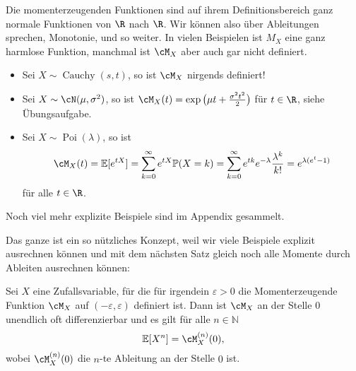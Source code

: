 Die momenterzeugenden Funktionen sind auf ihrem Definitionsbereich ganz normale Funktionen von $\R$ nach $\R$. Wir k\"onnen also \"uber Ableitungen sprechen, Monotonie, und so weiter. In vielen Beispielen ist $M_X$ eine ganz harmlose Funktion, manchmal ist $\cM_X$ aber auch gar nicht definiert.
\begin{beispiel}\label{momg} \abs

\begin{itemize}
	\item Sei $ X \sim \operatorname{Cauchy}(s,t)$, so ist $\cM_X$ nirgends definiert!
	\item Sei $X \sim \cN(\mu, \sigma^2)$, so ist $\cM_X(t) = \exp\big(\mu t + \frac{\sigma^2 t^2}{2}\big)$ f\"ur $t\in\R$, siehe \"Ubungsaufgabe.
	\item Sei $X\sim \operatorname{Poi}(\lambda)$, so ist $$\cM_X(t) = \mathbb{E}[e^{tX}] = \sum\limits_{k=0}^{\infty} e^{tX} \mathbb{P}(X = k) = \sum\limits_{k=0}^{\infty} e^{tk} e^{-\lambda} \frac{\lambda^k}{k!} = e^{\lambda(e^t - 1)}$$ f\"ur alle $t\in\R$.
	\end{itemize}
Noch viel mehr explizite Beispiele sind im Appendix gesammelt.
\end{beispiel}

Das ganze ist ein so n\"utzliches Konzept, weil wir viele Beispiele explizit ausrechnen k\"onnen und mit dem n\"achsten Satz gleich noch alle Momente durch Ableiten ausrechnen k\"onnen:

\begin{satz}
	Sei $X$ eine Zufallsvariable, f\"ur die f\"ur irgendein $\varepsilon>0$ die Momenterzeugende Funktion $\cM_X$ auf $(-\varepsilon, \varepsilon)$ definiert ist. Dann ist $\cM_X$ an der Stelle $0$ unendlich oft differenzierbar und es gilt f\"ur alle $n\in\mathbb N$ $$\mathbb{E}[X^n] = \cM_X^{(n)}(0),$$ wobei $\cM_X^{(n)}(0)$ die $n$-te Ableitung an der Stelle $0$ ist.
\end{satz}





